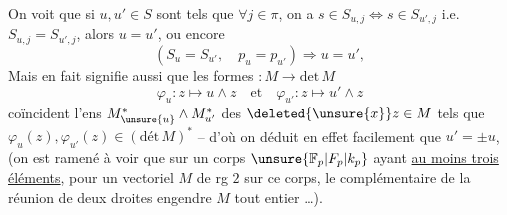 On voit  que si $u,u'\in S$ sont tels que $\forall j\in\pi$, on a $s\in S_{u,j}\iff s\in S_{u',j}$ i.e. $S_{u,j}=S_{u',j}$,  alors $u=u'$, ou encore
\[
(S_u=S_{u'},\quad p_u=p_{u'})\Longrightarrow u=u',\tag*{(113)}
\]
Mais en fait   signifie aussi que  les formes $:M\longrightarrow\mathrm{det}\,M$
\[
\varphi_u:z\mapsto u\wedge z\quad\text{et}\quad\varphi_{u'}:z\mapsto u'\wedge z
\]
 
coïncident   l'ens $M^*_{\unsure{u}}\wedge M^*_{u'}$ des $\deleted{\unsure{x}}z\in M$ tels que $\varphi_u(z),\varphi_{u'}(z)\in(\mathrm{dét}\,M)^*$ -- d'où on déduit en effet facilement que  $u'=\pm u$, 
(on est ramené à voir que sur un corps $\unsure{\mathbb F_p|F_p|k_p}$ ayant \uline{au moins trois éléments}, pour un vectoriel $M$ de rg $2$ sur ce corps, le  complémentaire de la réunion de deux droites engendre $M$ tout entier \ldots).

